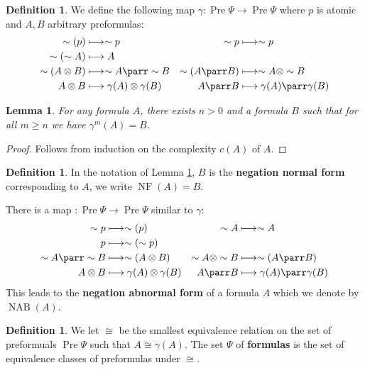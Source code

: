 \documentclass[12pt]{article}
\theoremstyle{plain}
\newtheorem{lemma}[thm]{Lemma}
\theoremstyle{definition}
\newtheorem{defn}[thm]{Definition} %
\newcommand{\lto}{\longrightarrow}
\newcommand{\negation}{\sim}
\begin{document}
	\begin{defn}\label{def:negation_normal_map}
		We define the following map $\gamma: \operatorname{Pre}\Psi \lto \operatorname{Pre}\Psi$ where $p$ is atomic and $A,B$ arbitrary preformulas:
		\begin{align*}
			\negation (p) &\longmapsto \negation p & \negation p &\longmapsto \negation p\\
			\negation (\negation A) &\longmapsto A \\
			\negation (A \otimes B) &\longmapsto \negation A \parr \negation B & \negation (A \parr B) &\longmapsto \negation A \otimes \negation B\\
			A \otimes B &\longmapsto \gamma(A) \otimes \gamma(B) & A \parr B &\longmapsto \gamma(A) \parr \gamma(B)
		\end{align*}
	\end{defn}
	\begin{lemma}\label{lem:negation_normal_form}
		For any formula $A$, there exists $n > 0$ and a formula $B$ such that for all $m \ge n$ we have $\gamma^m(A) = B$.
	\end{lemma}
	\begin{proof}
		Follows from induction on the complexity $c(A)$ of $A$.
	\end{proof}
	\begin{defn}
		In the notation of Lemma \ref{lem:negation_normal_form}, $B$ is the \textbf{negation normal form} corresponding to $A$, we write $\operatorname{NF}(A) = B$.
		
		There is a map $: \operatorname{Pre}\Psi \lto \operatorname{Pre}\Psi$ similar to $\gamma$:
		\begin{align*}
			\negation p &\longmapsto \negation (p) & \negation A &\longmapsto \negation A\\
			p &\longmapsto \negation (\negation p) \\
			\negation A \parr \negation B&\longmapsto  \negation (A \otimes B) & \negation A \otimes \negation B &\longmapsto \negation (A \parr B) \\
			A \otimes B &\longmapsto \gamma(A) \otimes \gamma(B) & A \parr B &\longmapsto \gamma(A) \parr \gamma(B)
		\end{align*}
		This leads to the \textbf{negation abnormal form} of a formula $A$ which we denote by $\operatorname{NAB}(A)$.
	\end{defn}
	\begin{defn}
		We let $\cong$ be the smallest equivalence relation on the set of preformuals $\operatorname{Pre}\Psi$ such that $A \cong \gamma(A)$. The set $\Psi$ of \textbf{formulas} is the set of equivalence classes of preformulas under $\cong$.
	\end{defn}
\end{document}
